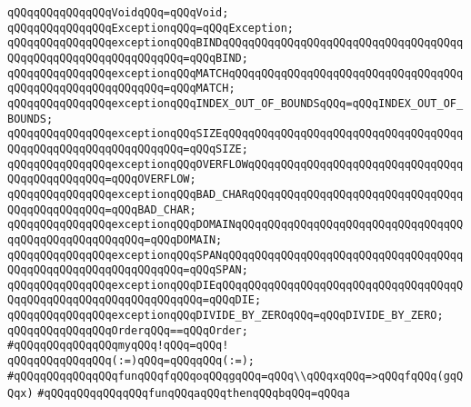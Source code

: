 \verb|qQQqqQQqqQQqqQQqVoidqQQq=qQQqVoid;|\newline
\verb|qQQqqQQqqQQqqQQqExceptionqQQq=qQQqException;|\newline
\newline
\verb|qQQqqQQqqQQqqQQqexceptionqQQqBINDqQQqqQQqqQQqqQQqqQQqqQQqqQQqqQQqqQQqqQQqqQQqqQQqqQQqqQQqqQQqqQQq=qQQqBIND;|\newline
\verb|qQQqqQQqqQQqqQQqexceptionqQQqMATCHqQQqqQQqqQQqqQQqqQQqqQQqqQQqqQQqqQQqqQQqqQQqqQQqqQQqqQQqqQQq=qQQqMATCH;|\newline
\verb|qQQqqQQqqQQqqQQqexceptionqQQqINDEX_OUT_OF_BOUNDSqQQq=qQQqINDEX_OUT_OF_BOUNDS;|\newline
\verb|qQQqqQQqqQQqqQQqexceptionqQQqSIZEqQQqqQQqqQQqqQQqqQQqqQQqqQQqqQQqqQQqqQQqqQQqqQQqqQQqqQQqqQQqqQQq=qQQqSIZE;|\newline
\verb|qQQqqQQqqQQqqQQqexceptionqQQqOVERFLOWqQQqqQQqqQQqqQQqqQQqqQQqqQQqqQQqqQQqqQQqqQQqqQQq=qQQqOVERFLOW;|\newline
\verb|qQQqqQQqqQQqqQQqexceptionqQQqBAD_CHARqQQqqQQqqQQqqQQqqQQqqQQqqQQqqQQqqQQqqQQqqQQqqQQq=qQQqBAD_CHAR;|\newline
\verb|qQQqqQQqqQQqqQQqexceptionqQQqDOMAINqQQqqQQqqQQqqQQqqQQqqQQqqQQqqQQqqQQqqQQqqQQqqQQqqQQqqQQq=qQQqDOMAIN;|\newline
\verb|qQQqqQQqqQQqqQQqexceptionqQQqSPANqQQqqQQqqQQqqQQqqQQqqQQqqQQqqQQqqQQqqQQqqQQqqQQqqQQqqQQqqQQqqQQq=qQQqSPAN;|\newline
\verb|qQQqqQQqqQQqqQQqexceptionqQQqDIEqQQqqQQqqQQqqQQqqQQqqQQqqQQqqQQqqQQqqQQqqQQqqQQqqQQqqQQqqQQqqQQqqQQq=qQQqDIE;|\newline
\newline
\verb|qQQqqQQqqQQqqQQqexceptionqQQqDIVIDE_BY_ZEROqQQq=qQQqDIVIDE_BY_ZERO;|\newline
\newline
\newline
\verb|qQQqqQQqqQQqqQQqOrderqQQq==qQQqOrder;|\newline
\newline
\verb|#qQQqqQQqqQQqqQQqmyqQQq!qQQq=qQQq!|\newline
\newline
\verb|qQQqqQQqqQQqqQQq(:=)qQQq=qQQqqQQq(:=);|\newline
\newline
\newline
\verb|#qQQqqQQqqQQqqQQqfunqQQqfqQQqoqQQqgqQQq=qQQq\\qQQqxqQQq=>qQQqfqQQq(gqQQqx)|\newline
\verb|#qQQqqQQqqQQqqQQqfunqQQqaqQQqthenqQQqbqQQq=qQQqa|\newline
